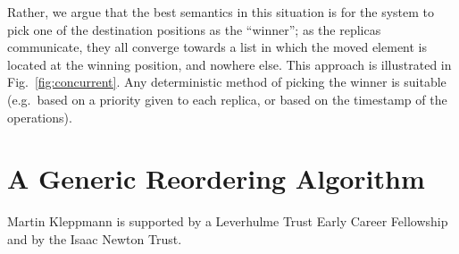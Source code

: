 \documentclass[sigplan,10pt]{acmart}
\begin{document}
Rather, we argue that the best semantics in this situation is for the system to pick one of the destination positions as the ``winner''; as the replicas communicate, they all converge towards a list in which the moved element is located at the winning position, and nowhere else.
This approach is illustrated in Fig.~\ref{fig:concurrent}.
Any deterministic method of picking the winner is suitable (e.g.\ based on a priority given to each replica, or based on the timestamp of the operations).

\section{A Generic Reordering Algorithm}

\begin{acks}
Martin Kleppmann is supported by a Leverhulme Trust Early Career Fellowship and by the Isaac Newton Trust.
\end{acks}


{}
\end{document}
